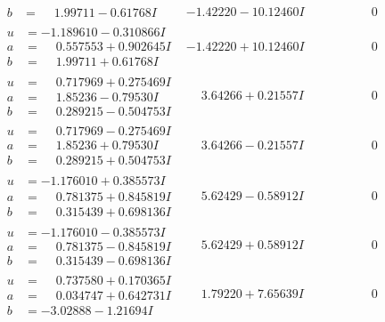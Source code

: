 \documentclass[1p]{elsarticle_modified}
\theoremstyle{definition}
\begin{document}
$$\begin{array}{c|c|c}
\begin{aligned}
b &= \phantom{-}1.99711 - 0.61768 I\end{aligned}
 & -1.42220 - 10.12460 I & \phantom{-0.000000 } 0 \\ \hline\begin{aligned}
u &= -1.189610 - 0.310866 I \\
a &= \phantom{-}0.557553 + 0.902645 I \\
b &= \phantom{-}1.99711 + 0.61768 I\end{aligned}
 & -1.42220 + 10.12460 I & \phantom{-0.000000 } 0 \\ \hline\begin{aligned}
u &= \phantom{-}0.717969 + 0.275469 I \\
a &= \phantom{-}1.85236 - 0.79530 I \\
b &= \phantom{-}0.289215 - 0.504753 I\end{aligned}
 & \phantom{-}3.64266 + 0.21557 I & \phantom{-0.000000 } 0 \\ \hline\begin{aligned}
u &= \phantom{-}0.717969 - 0.275469 I \\
a &= \phantom{-}1.85236 + 0.79530 I \\
b &= \phantom{-}0.289215 + 0.504753 I\end{aligned}
 & \phantom{-}3.64266 - 0.21557 I & \phantom{-0.000000 } 0 \\ \hline\begin{aligned}
u &= -1.176010 + 0.385573 I \\
a &= \phantom{-}0.781375 + 0.845819 I \\
b &= \phantom{-}0.315439 + 0.698136 I\end{aligned}
 & \phantom{-}5.62429 - 0.58912 I & \phantom{-0.000000 } 0 \\ \hline\begin{aligned}
u &= -1.176010 - 0.385573 I \\
a &= \phantom{-}0.781375 - 0.845819 I \\
b &= \phantom{-}0.315439 - 0.698136 I\end{aligned}
 & \phantom{-}5.62429 + 0.58912 I & \phantom{-0.000000 } 0 \\ \hline\begin{aligned}
u &= \phantom{-}0.737580 + 0.170365 I \\
a &= \phantom{-}0.034747 + 0.642731 I \\
b &= -3.02888 - 1.21694 I\end{aligned}
 & \phantom{-}1.79220 + 7.65639 I & \phantom{-0.000000 } 0 \\ \hline\begin{aligned}

\end{aligned}
\end{array}$$
\end{document}
